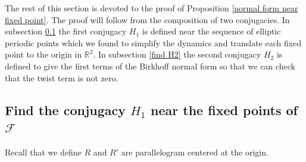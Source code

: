 \documentclass{article}
\numberwithin{figure}{section}
\numberwithin{equation}{section}
\theoremstyle{remark}
\theoremstyle{definition}
\begin{document}
The rest of this section is devoted to the proof of {\color{red}Proposition \ref{normal form near fixed point}}. The proof will follow from the composition of two conjugacies. 
In subsection \ref{find H1} the first conjugacy $H_1$ is defined near the sequence of elliptic periodic points which we found to simplify the dynamics and translate each fixed point to the origin in $\mathbb{R}^2$. In subsection \ref{find H2} the second conjugacy $H_2$ is defined to give the first terms of the Birkhoff normal form so that we can check that the twist term is not zero.

\subsection{Find the conjugacy \texorpdfstring{$H_1$}{TEXT} near the fixed points of  \texorpdfstring{$\mathcal{F}$}{TEXT}}\label{find H1}
Recall that we define $R$ and $R'$ are parallelogram centered at the origin.
\end{document}
